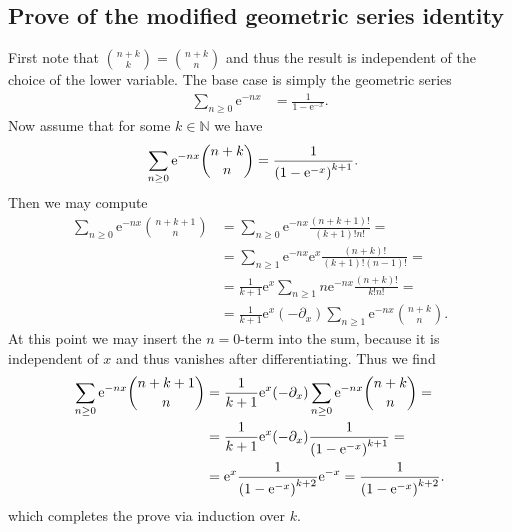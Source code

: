 \documentclass[english, parskip=full]{scrartcl}
\DeclarePairedDelimiter\kla{(}{)}
\newcommand{\e}{\text{e}}
\newcommand{\powe}[1]{\e^{#1}}
\begin{document}
\subsection{Prove of the modified geometric series identity}\label{subsec:modified geometric series}
First note that $\binom{n+k}{k}=\binom{n+k}{n}$ and thus the result is independent of the choice of the lower variable.
The base case is simply the geometric series
\begin{align}
\sum_{n\ge 0} \e^{-nx} &= \frac{1}{1 - \powe{-x}}.
\end{align}
Now assume that for some $k\in\mathbb{N}$ we have
\begin{align}
\sum_{n\ge 0} \powe{-nx} \binom{n+k}{n} &= \frac{1}{\kla*{1 - \powe{-x}}^{k+1}}.
\end{align}
Then we may compute
\begin{align}
\sum_{n\ge 0} \powe{-nx} \binom{n+k+1}{n} &= \sum_{n\ge 0} \powe{-nx} \frac{(n+k+1)!}{(k+1)!n!} = \\
&= \sum_{n\ge 1} \powe{-nx}\powe{x} \frac{(n+k)!}{(k+1)!(n-1)!} = \\
&= \frac{1}{k+1} \powe{x} \sum_{n\ge 1} n\powe{-nx} \frac{(n+k)!}{k!n!} = \\
&= \frac{1}{k+1} \e^x (-\partial_x) \sum_{n\ge 1} \powe{-nx} \binom{n+k}{n}.
\end{align}
At this point we may insert the $n=0$-term into the sum, because it is independent of $x$ and thus vanishes after differentiating.
Thus we find
\begin{align}
\sum_{n\ge 0} \powe{-nx} \binom{n+k+1}{n} &= \frac{1}{k+1} \e^x (-\partial_x) \sum_{n\ge 0} \powe{-nx} \binom{n+k}{n} = \\
&= \frac{1}{k+1} \e^x (-\partial_x) \frac{1}{\kla*{1 - \powe{-x}}^{k+1}} = \\
&= \e^x \frac{1}{\kla*{1 - \powe{-x}}^{k+2}} \powe{-x} = \frac{1}{\kla*{1 - \powe{-x}}^{k+2}}.
\end{align}
which completes the prove via induction over $k$.

\end{document}
